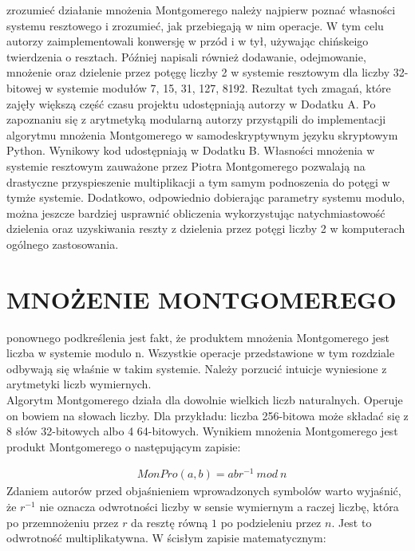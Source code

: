 \documentclass[10pt,journal,compsoc]{IEEEtran}
\begin{document}
 zrozumieć działanie mnożenia Montgomerego należy najpierw poznać własności systemu resztowego i zrozumieć, jak przebiegają w nim operacje. W tym celu autorzy zaimplementowali konwersję w przód i w tył, używając chińskeigo twierdzenia o resztach. Później napisali również dodawanie, odejmowanie, mnożenie oraz dzielenie przez potęgę liczby 2 w systemie resztowym dla liczby 32-bitowej w systemie modułów 7, 15, 31, 127, 8192. Rezultat tych zmagań, które zajęły większą część czasu projektu udostępniają autorzy w Dodatku A. Po zapoznaniu się z arytmetyką modularną autorzy przystąpili do implementacji algorytmu mnożenia Montgomerego w samodeskryptywnym języku skryptowym Python. Wynikowy kod udostępniają w Dodatku B. Własności mnożenia w systemie resztowym zauważone przez Piotra Montgomerego pozwalają na drastyczne przyspieszenie multiplikacji a tym samym podnoszenia do potęgi w tymże systemie. Dodatkowo, odpowiednio dobierając parametry systemu modulo, można jeszcze bardziej usprawnić obliczenia wykorzystując natychmiastowość dzielenia oraz uzyskiwania reszty z dzielenia przez potęgi liczby 2 w komputerach ogólnego zastosowania.

\section{MNOŻENIE MONTGOMEREGO}
 ponownego podkreślenia jest fakt, że produktem mnożenia Montgomerego jest liczba w systemie modulo n. Wszystkie operacje przedstawione w tym rozdziale odbywają się właśnie w takim systemie. Należy porzucić intuicje wyniesione z arytmetyki liczb wymiernych.\\
Algorytm Montgomerego działa dla dowolnie wielkich liczb naturalnych. Operuje on bowiem na słowach liczby. Dla przykładu: liczba 256-bitowa może składać się z 8 słów 32-bitowych albo 4 64-bitowych. Wynikiem mnożenia Montgomerego jest produkt Montgomerego o następującym zapisie:

\begin{align*}
  &MonPro(a,b) = abr^{-1}\ mod\ n
\end{align*}
\noindent
Zdaniem autorów przed objaśnieniem wprowadzonych symbolów warto wyjaśnić, że $r^{-1}$ nie oznacza odwrotności liczby w sensie wymiernym a raczej liczbę, która po przemnożeniu przez $r$ da resztę równą $1$ po podzieleniu przez $n$. Jest to odwrotność multiplikatywna. W ścisłym zapisie matematycznym:
\end{document}
